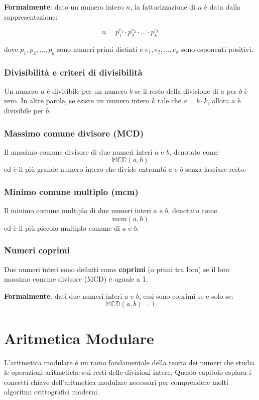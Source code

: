 \documentclass[a4paper,12pt]{report}
\begin{document}
\textbf{Formalmente}: dato un numero intero \( n \), la fattorizzazione di \( n \) è data dalla rappresentazione: 

\[ n = p_1^{e_1} \cdot p_2^{e_2} \cdot \ldots \cdot p_k^{e_k} \]

dove \( p_1, p_2, \ldots, p_k \) sono numeri primi distinti e \( e_1, e_2, \ldots, e_k \) sono esponenti positivi.

\subsection*{Divisibilità e criteri di divisibilità}

Un numero \(a\) è divisibile per un numero \(b\) se il resto della divisione di \(a\) per \(b\) è zero. In altre parole, se esiste un numero intero \(k\) tale che \(a = b \cdot k\), allora \(a\) è divisibile per \(b\).

\subsection*{Massimo comune divisore (MCD)}
Il massimo comune divisore di due numeri interi \( a \) e \( b \), denotato come 
\[ \mathbb{MCD}(a, b) \] 
ed è il più grande numero intero che divide entrambi \( a \) e \( b \) senza lasciare resto.

\subsection*{Minimo comune multiplo (mcm)}
Il minimo comune multiplo di due numeri interi \( a \) e \( b \), denotato come 
\[ \mathrm{mcm}(a, b) \]
ed è il più piccolo multiplo comune di \( a \) e \( b \).

\subsection*{Numeri coprimi}
Due numeri interi sono definiti come \textbf{coprimi} (o primi tra loro) se il loro massimo comune divisore (MCD) è uguale a 1. 

\textbf{Formalmente}: dati due numeri interi \(a\) e \(b\), essi sono coprimi se e solo se:
\[\mathbb{MCD}(a, b) = 1\]

\chapter{Aritmetica Modulare}

L'aritmetica modulare è un ramo fondamentale della teoria dei numeri che studia le operazioni aritmetiche sui resti delle divisioni intere. Questo capitolo esplora i concetti chiave dell'aritmetica modulare necessari per comprendere molti algoritmi crittografici moderni.
\end{document}
